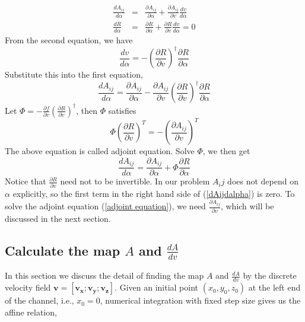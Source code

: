 \documentclass{article}
\begin{document}
 
\begin{eqnarray*} 
  \frac{dA_{ij}}{d\alpha} & = & \frac{\partial{A_{ij}}}{\partial{\alpha}}+
                                \frac{\partial{A_{ij}}}{\partial{v}} \frac{dv}{d\alpha}\\
  \frac{dR}{d\alpha} & = & \frac{\partial{R}}{\partial{\alpha}}+\frac{\partial{R}}{\partial{v}} \frac{dv}{d\alpha}=0
\end{eqnarray*} 
From the second equation, we have
\begin{equation*}
  \frac{dv}{d\alpha}= -\left(\frac{\partial{R}}{\partial{v}}\right)^{\dagger}\frac{\partial{R}}{\partial{\alpha}}
\end{equation*}
Substitute this into the first equation,
\begin{equation*}
   \frac{dA_{ij}}{d\alpha}  =  \frac{\partial{A_{ij}}}{\partial{\alpha}}-\frac{\partial{A_{ij}}}{\partial{v}} \left(\frac{\partial{R}}{\partial{v}}\right)^{\dagger}\frac{\partial{R}}{\partial{\alpha}} 
\end{equation*}
Let $\Phi = -\frac{\partial{f}}{\partial{v}} \left(\frac{\partial{R}}{\partial{v}}\right)^{\dagger}$, then $\Phi$ satisfies
\begin{equation}
\label{adjoint equation}
 \Phi \left(\frac{\partial{R}}{\partial{v}}\right)^{T} = -\left({\frac{\partial{A_{ij}}}{\partial{v}}}\right)^T
\end{equation}
The above equation is called adjoint equation. Solve $\Phi$, we then get
\begin{equation}
\label{dAijdalpha}
  \frac{dA_{ij}}{d\alpha}  =  \frac{\partial{A_{ij}}}{\partial{\alpha}}+\Phi \frac{\partial{R}}{\partial{\alpha}} 
\end{equation}
Notice that $\frac{\partial{R}}{\partial{v}}$ need not to be invertible. In our problem $A_ij$ does not depend on $\alpha$ explicitly, so the first term in the right hand side of (\ref{dAijdalpha}) is zero. To solve the adjoint equation (\ref{adjoint equation}), we need $\frac{\partial{A_{ij}}}{\partial{v}}$, which will be discussed in the next section. 

\subsection{Calculate the map $A$ and $\frac{dA}{dv}$} 

In this section we discuss the detail of finding the map $A$ and $\frac{dA}{dv}$ by the discrete velocity field $\mathbf{v} = [\mathbf{v_{x}}; \mathbf{v_{y}}; \mathbf{v_{z}}]$. Given an initial point $(x_{0},y_{0},z_{0})$ at the left end of the channel, i.e., $x_{0}=0$, numerical integration with fixed step size gives us the affine relation,
\end{document}
